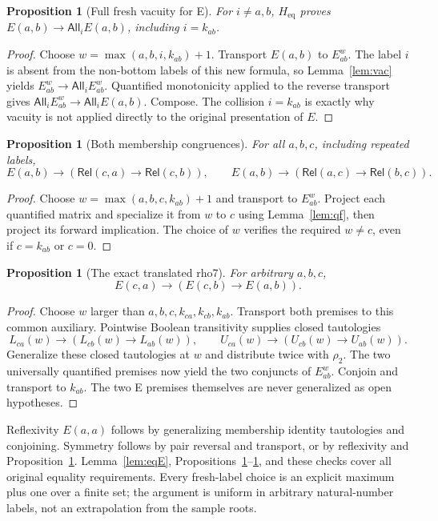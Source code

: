 \documentclass[11pt,letterpaper]{article}
\newtheorem{proposition}[theorem]{Proposition}
\theoremstyle{definition}\newtheorem{definition}[theorem]{Definition}
\theoremstyle{remark}\newtheorem{remark}[theorem]{Remark}
\newcommand{\Rel}{\mathsf{Rel}}
\newcommand{\All}{\mathsf{All}}
\newcommand{\To}{\rightarrow}
\newcommand{\Hh}{H_{\mathrm{eq}}}
\begin{document}
\begin{proposition}[Full fresh vacuity for E]\label{prop:Evac}
For $i\ne a,b$, $\Hh$ proves $E(a,b)\To\All_i E(a,b)$, including $i=k_{ab}$.
\end{proposition}
\begin{proof}
Choose $w=\max(a,b,i,k_{ab})+1$. Transport $E(a,b)$ to $E_{ab}^{w}$. The label $i$ is absent from the non-bottom labels of this new formula, so Lemma~\ref{lem:vac} yields $E_{ab}^{w}\To\All_i E_{ab}^{w}$. Quantified monotonicity applied to the reverse transport gives $\All_i E_{ab}^{w}\To\All_iE(a,b)$. Compose. The collision $i=k_{ab}$ is exactly why vacuity is not applied directly to the original presentation of $E$.
\end{proof}

\begin{proposition}[Both membership congruences]\label{prop:cong}
For all $a,b,c$, including repeated labels,
\[
 E(a,b)\To(\Rel(c,a)\To\Rel(c,b)),\qquad
 E(a,b)\To(\Rel(a,c)\To\Rel(b,c)).
\]
\end{proposition}
\begin{proof}
Choose $w=\max(a,b,c,k_{ab})+1$ and transport to $E_{ab}^{w}$. Project each quantified matrix and specialize it from $w$ to $c$ using Lemma~\ref{lem:qf}, then project its forward implication. The choice of $w$ verifies the required $w\ne c$, even if $c=k_{ab}$ or $c=0$.
\end{proof}

\begin{proposition}[The exact translated rho7]\label{prop:E7}
For arbitrary $a,b,c$,
\[
 E(c,a)\To(E(c,b)\To E(a,b)).
\]
\end{proposition}
\begin{proof}
Choose $w$ larger than $a,b,c,k_{ca},k_{cb},k_{ab}$. Transport both premises to this common auxiliary. Pointwise Boolean transitivity supplies closed tautologies
\[
 L_{ca}(w)\To(L_{cb}(w)\To L_{ab}(w)),\qquad
 U_{ca}(w)\To(U_{cb}(w)\To U_{ab}(w)).
\]
Generalize these closed tautologies at $w$ and distribute twice with $\rho_2$. The two universally quantified premises now yield the two conjuncts of $E_{ab}^{w}$. Conjoin and transport to $k_{ab}$. The two E premises themselves are never generalized as open hypotheses.
\end{proof}
Reflexivity $E(a,a)$ follows by generalizing membership identity tautologies and conjoining. Symmetry follows by pair reversal and transport, or by reflexivity and Proposition~\ref{prop:E7}. Lemma~\ref{lem:eqE}, Propositions~\ref{prop:Evac}--\ref{prop:E7}, and these checks cover all original equality requirements. Every fresh-label choice is an explicit maximum plus one over a finite set; the argument is uniform in arbitrary natural-number labels, not an extrapolation from the sample roots.
\end{document}
